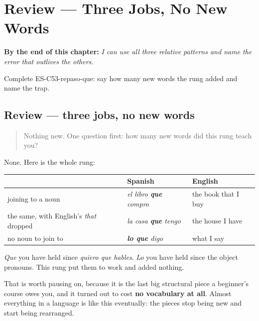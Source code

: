 
\chapter{Review --- Three Jobs, No New Words}
\label{ch:review-relative}

\begin{chapteropening}
\textbf{By the end of this chapter:} \emph{I can use all three relative patterns and name the error that outlives the others.}

Complete ES-C53-repaso-que: say how many new words the rung added and name the trap.
\end{chapteropening}

\section[Practice]{Review — three jobs, no new words}

\label{lesson:ES-C53-repaso-que}



\begin{quote}
Nothing new. One question first: how many new words did this rung teach you?
\end{quote}

\begin{grammarlens}[title={What you've built}]
None. Here is the whole rung:

\noindent
\begin{tabularx}{\linewidth}{@{}>{\raggedright\arraybackslash}X>{\raggedright\arraybackslash}X>{\raggedright\arraybackslash}X@{}}
\toprule
\textbf{} & \textbf{Spanish} & \textbf{English} \\
\midrule
joining to a noun & \emph{el libro \textbf{que} compro} & the book that I buy \\
the same, with English's \emph{that} dropped & \emph{la casa \textbf{que} tengo} & the house I have \\
no noun to join to & \emph{\textbf{lo que} digo} & what I say \\
\bottomrule
\end{tabularx}

\emph{Que} you have held since \emph{quiero que hables}. \emph{Lo} you have held since the object pronouns. This rung put them to work and added nothing.

That is worth pausing on, because it is the last big structural piece a beginner's course owes you, and it turned out to cost \textbf{no vocabulary at all}. Almost everything in a language is like this eventually: the pieces stop being new and start being rearranged.
\end{grammarlens}

